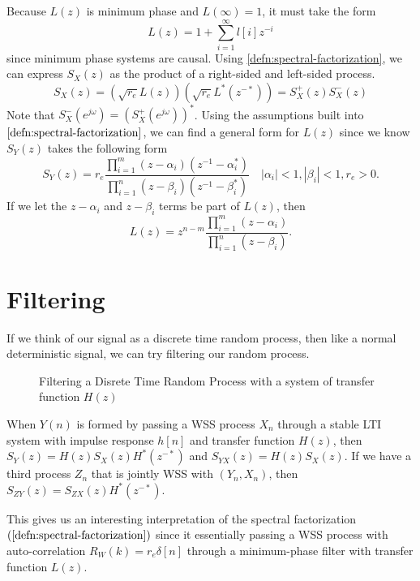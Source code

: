 Because $L(z)$ is minimum phase and $L(\infty)=1$, it must take the form \[
	L(z) = 1 + \sum_{i=1}^\infty l[i]z^{-i}
\] since minimum phase systems are causal.
Using \cref{defn:spectral-factorization}, we can express $S_X(z)$ as the product of a right-sided and left-sided process.
\[
	S_X(z) = (\sqrt{r_e}L(z))(\sqrt{r_e}L^*(z^{-*})) = S_X^+(z)S_X^-(z)
\]
Note that $S_X^-(e^{j\omega}) = \left(S_X^+(e^{j\omega})\right)^*$.
Using the assumptions built into $\cref{defn:spectral-factorization}$, we can find a general form for $L(z)$ since we know $S_Y(z)$ takes the following form
\[
	S_Y(z) = r_e \frac{\prod_{i=1}^m(z-\alpha_i)(z^{-1}-\alpha_i^*)}{\prod_{i=1}^n(z-\beta_i)(z^{-1}-\beta_i^*)}\quad |\alpha_i| < 1, |\beta_i| < 1, r_e > 0.
\]
If we let the $z - \alpha_i$ and $z-\beta_i$ terms be part of $L(z)$, then
\[
	L(z) = z^{n-m}\frac{\prod_{i=1}^m(z-\alpha_i)}{\prod_{i=1}^n(z-\beta_i)}.
\]
\section{Filtering}
If we think of our signal as a discrete time random process, then like a normal deterministic signal, we can try filtering our random process.
\begin{gitbook-image}
\begin{figure}[!h]
  \centering
	\caption{Filtering a Disrete Time Random Process with a system of transfer function $H(z)$}
  \label{fig:lti-filtering}
\end{figure}
\end{gitbook-image}
\begin{theorem}
	When $Y(n)$ is formed by passing a WSS process $X_n$ through a stable LTI system with impulse response $h[n]$ and transfer function $H(z)$, then $S_Y(z) = H(z)S_X(z)H^*(z^{-*})$ and $S_{YX}(z) = H(z)S_X(z)$.
	If we have a third process $Z_n$ that is jointly WSS with $(Y_n, X_n)$, then $S_{ZY}(z) = S_{ZX}(z)H^*(z^{-*})$.
	\label{thm:lti-process}
\end{theorem}
This gives us an interesting interpretation of the spectral factorization $(\cref{defn:spectral-factorization})$ since it essentially passing a WSS process with auto-correlation $R_W(k) = r_e\delta[n]$ through a minimum-phase filter with transfer function $L(z)$.

